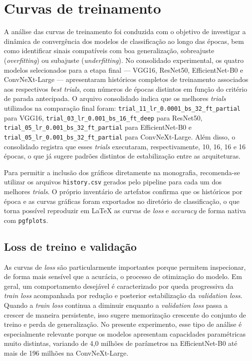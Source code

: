 \documentclass[tcc,capa]{texufpel}
\begin{document}
\section{Curvas de treinamento}

A análise das curvas de treinamento foi conduzida com o objetivo de investigar a dinâmica de convergência dos modelos de classificação ao longo das épocas, bem como identificar sinais compatíveis com boa generalização, sobreajuste (\textit{overfitting}) ou subajuste (\textit{underfitting}). No consolidado experimental, os quatro modelos selecionados para a etapa final --- VGG16, ResNet50, EfficientNet-B0 e ConvNeXt-Large --- apresentaram históricos completos de treinamento associados aos respectivos \textit{best trials}, com números de épocas distintos em função do critério de parada antecipada. O arquivo consolidado indica que os melhores \textit{trials} utilizados na comparação final foram: \texttt{trial\_11\_lr\_0.0001\_bs\_32\_ft\_partial} para VGG16, \texttt{trial\_03\_lr\_0.001\_bs\_16\_ft\_deep} para ResNet50, \texttt{trial\_05\_lr\_0.001\_bs\_32\_ft\_partial} para EfficientNet-B0 e \texttt{trial\_05\_lr\_0.001\_bs\_32\_ft\_partial} para ConvNeXt-Large. Além disso, o consolidado registra que esses \textit{trials} executaram, respectivamente, 10, 16, 16 e 16 épocas, o que já sugere padrões distintos de estabilização entre as arquiteturas. 

Para permitir a inclusão dos gráficos diretamente na monografia, recomenda-se utilizar os arquivos \texttt{history.csv} gerados pelo pipeline para cada um dos melhores \textit{trials}. O próprio inventário de artefatos confirma que os históricos por época e as curvas gráficas foram exportados no diretório de classificação, o que torna possível reproduzir em \LaTeX{} as curvas de \textit{loss} e \textit{accuracy} de forma nativa com \texttt{pgfplots}. 

\subsection{Loss de treino e validação}

As curvas de \textit{loss} são particularmente importantes porque permitem inspecionar, de forma mais sensível que a acurácia, o processo de otimização do modelo. Em geral, um comportamento desejável é caracterizado por queda progressiva da \textit{train loss} acompanhada por redução e posterior estabilização da \textit{validation loss}. Quando a \textit{train loss} continua a diminuir enquanto a \textit{validation loss} passa a crescer de maneira persistente, isso sugere memorização crescente do conjunto de treino e perda de generalização. No presente experimento, esse tipo de análise é especialmente relevante porque os modelos apresentam capacidades paramétricas muito distintas, variando de 4,0 milhões de parâmetros na EfficientNet-B0 até mais de 196 milhões na ConvNeXt-Large.
\end{document}
